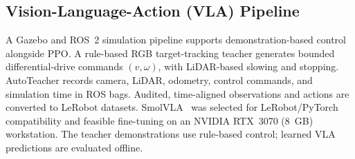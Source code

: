 \subsection{Vision-Language-Action (VLA) Pipeline}\label{sec:vla}

A Gazebo and ROS~2 simulation pipeline supports demonstration-based control alongside PPO. A rule-based RGB target-tracking teacher generates bounded differential-drive commands $(v,\omega)$, with LiDAR-based slowing and stopping. AutoTeacher records camera, LiDAR, odometry, control commands, and simulation time in ROS bags. Audited, time-aligned observations and actions are converted to LeRobot datasets. SmolVLA~\cite{shukor2025smolvla} was selected for LeRobot/PyTorch compatibility and feasible fine-tuning on an NVIDIA RTX~3070 (8~GB) workstation. The teacher demonstrations use rule-based control; learned VLA predictions are evaluated offline.

